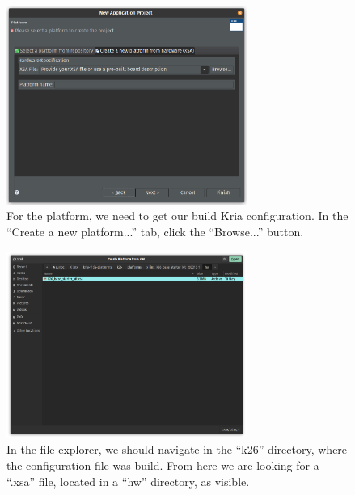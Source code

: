 \documentclass[10pt]{article}
\begin{document}
\begin{figure}[H]
  \centering
  \includegraphics[width=0.7\textwidth]{./img/vitis_new/project2}
  \caption{For the platform, we need to get our build Kria configuration. In the ``Create a new platform...'' tab, click the ``Browse...'' button.}
  \label{fig:project2}
\end{figure}

\begin{figure}[H]
  \centering
  \includegraphics[width=0.7\textwidth]{./img/vitis_new/project3}
  \caption{In the file explorer, we should navigate in the ``k26'' directory, where the configuration file was build.
    From here we are looking for a ``.xsa'' file, located in a ``hw'' directory, as visible.}
  \label{fig:project3}
\end{figure}
\end{document}

